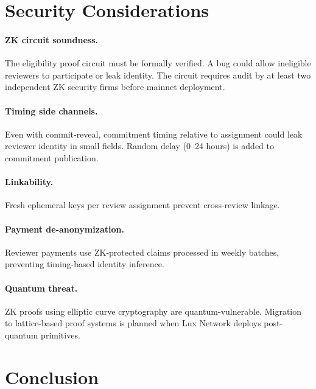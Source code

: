 \documentclass[11pt,letterpaper]{article}
\begin{document}
\section{Security Considerations}
\label{sec:security}

\paragraph{ZK circuit soundness.} The eligibility proof circuit must be formally verified. A bug could allow ineligible reviewers to participate or leak identity. The circuit requires audit by at least two independent ZK security firms before mainnet deployment.

\paragraph{Timing side channels.} Even with commit-reveal, commitment timing relative to assignment could leak reviewer identity in small fields. Random delay (0--24 hours) is added to commitment publication.

\paragraph{Linkability.} Fresh ephemeral keys per review assignment prevent cross-review linkage.

\paragraph{Payment de-anonymization.} Reviewer payments use ZK-protected claims processed in weekly batches, preventing timing-based identity inference.

\paragraph{Quantum threat.} ZK proofs using elliptic curve cryptography are quantum-vulnerable. Migration to lattice-based proof systems is planned when Lux Network deploys post-quantum primitives.

\section{Conclusion}
\label{sec:conclusion}
\end{document}
